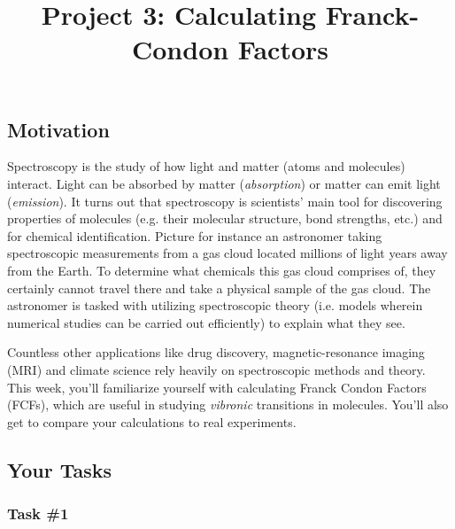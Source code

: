 \documentclass[12pt]{article}
\title{Project 3: Calculating Franck-Condon Factors}
\begin{document}
\maketitle

\thispagestyle{empty}

\subsection*{Motivation}

Spectroscopy is the study of how light and matter (atoms and molecules) interact.
Light can be absorbed by matter (\textit{absorption}) or matter can emit light (\textit{emission}).
It turns out that spectroscopy is scientists' main tool for discovering properties of molecules (e.g. their molecular structure, bond strengths, etc.) and for chemical identification. Picture for instance an astronomer taking spectroscopic measurements from a gas cloud located millions of light years away from the Earth. To determine what chemicals this gas cloud comprises of, they certainly cannot travel there and take a physical sample of the gas cloud. The astronomer is tasked with utilizing spectroscopic theory (i.e. models wherein numerical studies can be carried out efficiently) to explain what they see.

Countless other applications like drug discovery, magnetic-resonance imaging (MRI) and climate science rely heavily on spectroscopic methods and theory. This week, you'll familiarize yourself with calculating Franck Condon Factors (FCFs), which are useful in studying {\it vibronic} transitions in molecules. You'll also get to compare your calculations to real experiments.

\subsection*{Your Tasks}

\subsubsection*{Task \#1}
\end{document}
